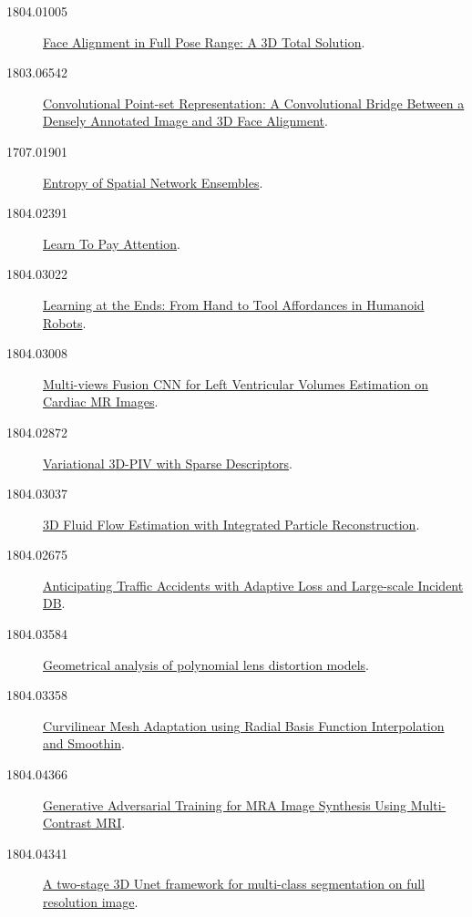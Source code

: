 \begin{description}
\item[1804.01005] \href{https://arxiv.org/abs/1804.01005}{Face Alignment in Full
    Pose Range: A 3D Total Solution}.

\item[1803.06542] \href{https://arxiv.org/abs/1803.06542}{Convolutional
    Point-set Representation: A Convolutional Bridge Between a Densely
    Annotated Image and 3D Face Alignment}.

\item[1707.01901] \href{https://arxiv.org/abs/1707.01901}{Entropy of Spatial
    Network Ensembles}.

\item[1804.02391] \href{https://arxiv.org/abs/1804.02391}{Learn To Pay
    Attention}.

\item[1804.03022] \href{https://arxiv.org/abs/1804.03022}{Learning at the Ends:
    From Hand to Tool Affordances in Humanoid Robots}.

\item[1804.03008] \href{https://arxiv.org/abs/1804.03008}{Multi-views Fusion CNN
    for Left Ventricular Volumes Estimation on Cardiac MR Images}.

\item[1804.02872] \href{https://arxiv.org/abs/1804.02872}{Variational 3D-PIV
    with Sparse Descriptors}.

\item[1804.03037] \href{https://arxiv.org/abs/1804.03037}{3D Fluid Flow
    Estimation with Integrated Particle Reconstruction}.

\item[1804.02675] \href{https://arxiv.org/abs/1804.02675}{Anticipating Traffic
    Accidents with Adaptive Loss and Large-scale Incident DB}.
  
\item[1804.03584] \href{https://arxiv.org/abs/1804.03584}{Geometrical analysis
    of polynomial lens distortion models}.

\item[1804.03358] \href{https://arxiv.org/abs/1804.03358}{Curvilinear Mesh
    Adaptation using Radial Basis Function Interpolation and Smoothin}.

\item[1804.04366] \href{https://arxiv.org/abs/1804.04366}{Generative Adversarial
    Training for MRA Image Synthesis Using Multi-Contrast MRI}.

\item[1804.04341] \href{https://arxiv.org/abs/1804.04341}{A two-stage 3D Unet
    framework for multi-class segmentation on full resolution image}.


\end{description}
